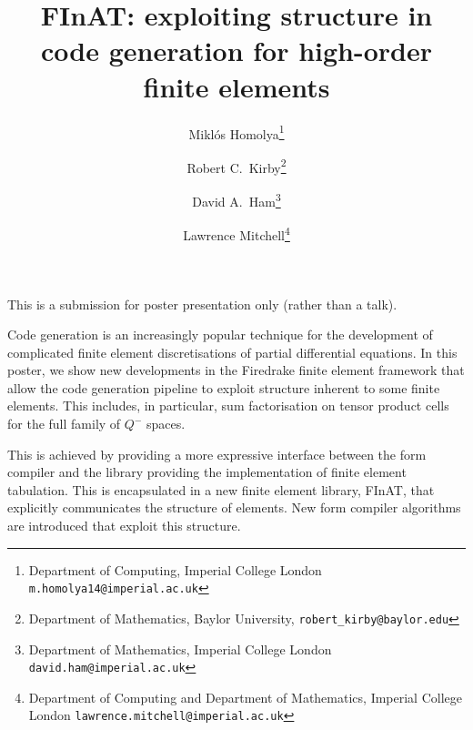 \documentclass{article}
\begin{document}
\title{FInAT: exploiting structure in code generation for high-order finite elements}
\author{%
  Mikl\'os Homolya\thanks{Department of Computing, Imperial College
    London \texttt{m.homolya14@imperial.ac.uk}}
  \and
  Robert C.~Kirby\thanks{Department of Mathematics, Baylor University,
    \texttt{robert\_kirby@baylor.edu}}
  \and
  David A.~Ham\thanks{Department of Mathematics, Imperial College
    London \texttt{david.ham@imperial.ac.uk}}
  \and
  Lawrence Mitchell\thanks{Department of Computing and Department of
    Mathematics, Imperial College London
    \texttt{lawrence.mitchell@imperial.ac.uk}}
}
\maketitle

{\Large This is a submission for poster presentation only (rather than
  a talk).}

Code generation is an increasingly popular technique for the
development of complicated finite element discretisations of partial
differential equations.  In this poster, we show new developments in
the Firedrake finite element framework that allow the code generation
pipeline to exploit structure inherent to some finite elements.  This
includes, in particular, sum factorisation on tensor product cells for
the full family of $Q^-$ spaces.

This is achieved by providing a more expressive interface between the
form compiler and the library providing the implementation of finite
element tabulation.  This is encapsulated in a new finite element
library, FInAT, that explicitly communicates the structure of
elements.  New form compiler algorithms are introduced that exploit
this structure.
\end{document}
